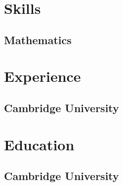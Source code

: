 \documentclass{notunprofessional}
\begin{document}
\section{Skills}
\subsection{Mathematics}
\section{Experience}
\subsection{Cambridge University}
\section{Education}
\subsection{Cambridge University}
\end{document}
